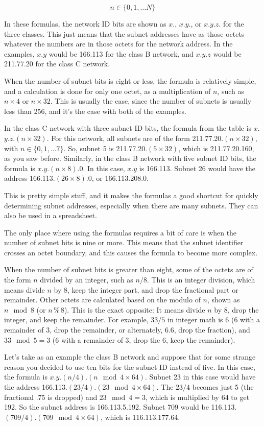 \[n \in \{ 0, 1, \ldots N \} \]

In these formulas, the network ID bits are shown as $x$., $x$.$y$., or $x$.$y$.$z$. for the three classes.
This just means that the subnet addresses have as those octets whatever the numbers are in those octets for the network address.
In the examples, $x$.$y$ would be 166.113 for the class B network, and $x$.$y$.$z$ would be 211.77.20 for the class C network.

When the number of subnet bits is eight or less, the formula is relatively simple, and a calculation is done for only one octet, as a
multiplication of $n$, such as $n\times 4$ or $n\times 32$.
This is usually the case, since the number of subnets is usually less than 256, and it's the case with both of the examples.

In the class C network with three subnet ID bits, the formula from the table is $x$.$y$.$z$.$(n\times 32)$.
For this network, all subnets are of the form 211.77.20.$(n\times 32)$, with $n \in \{ 0, 1, \ldots 7\}$.
So, subnet 5 is 211.77.20.$(5\times 32)$, which is 211.77.20.160, as you saw before.
Similarly, in the class B network with five subnet ID bits, the formula is $x$.$y$.$(n\times 8)$.0.
In this case, $x$.$y$ is 166.113.
Subnet 26 would have the address 166.113.$(26\times 8)$.0, or 166.113.208.0.

This is pretty simple stuff, and it makes the formulas a good shortcut for quickly determining subnet addresses, especially when there are many subnets.
They can also be used in a spreadsheet.

The only place where using the formulas requires a bit of care is when the number of subnet bits is nine or more.
This means that the subnet identifier crosses an octet boundary, and this causes the formula to become more complex.

When the number of subnet bits is greater than eight, some of the octets are of the form $n$ divided by an integer, such as $n/8$.
This is an integer division, which means divide $n$ by 8, keep the integer part, and drop the fractional part or remainder.
Other octets are calculated based on the modulo of $n$, shown as $n\mod 8$ (or $n$\,\%\,8).
This is the exact opposite: It means divide $n$ by 8, drop the integer, and keep the remainder.
For example, $33/5$ in integer math is 6 (6 with a remainder of 3, drop the remainder, or alternately, 6.6, drop the fraction),
and $33\mod 5 = 3$ (6 with a remainder of 3, drop the 6, keep the remainder).

Let's take as an example the class B network and suppose that for some strange reason you decided to use ten bits for the subnet ID instead of five.
In this case, the formula is $x$.$y$.$(n/4)$.$(n\mod 4 \times 64)$.
Subnet 23
in this case would have the address 166.113.$(23/4)$.$(23\mod 4\times 64)$.
The $23/4$ becomes just 5 (the fractional .75 is dropped) and $23 \mod 4 = 3$, which is multiplied by 64 to get 192.
So the subnet address is 166.113.5.192.
Subnet 709 would be 116.113.$(709/4)$.$(709\mod 4\times 64)$, which is 116.113.177.64.

